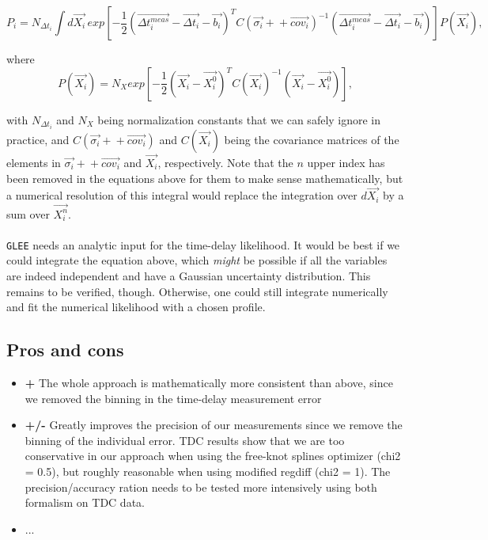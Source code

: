 \documentclass[11pt]{scrartcl}
\renewcommand{\vec}{\overrightarrow}  %
\begin{document}
\begin{equation*}
 P_i = N_{\Delta 
t_{i}}\int d\vec{X_i}\,exp\left[-\frac{1}{2}(\vec{\Delta 
t_i^{meas}}-\vec{\Delta t_i}-\vec{b_i})^T C(\vec{\sigma_i}+\!\!+ 
\vec{cov_i})^{-1}(\vec{\Delta 
t_i^{meas}}-\vec{\Delta t_i}-\vec{b_i})  \right]P(\vec{X_i}),
\end{equation*}

where
\begin{equation*}
 P(\vec{X_i}) = N_Xexp\left[-\frac{1}{2} (\vec{X_i}-\vec{X_i^0})^T 
C(\vec{X_i})^{-1} (\vec{X_i}-\vec{X_i^0})\right],
\end{equation*}

with $N_{\Delta 
t_{i}}$ and $N_X$ being normalization constants that we can safely 
ignore in practice, and $C(\vec{\sigma_i}+\!\!+ 
\vec{cov_i})$ and $C(\vec{X_i})$ being the covariance matrices of 
the elements in $\vec{\sigma_i}+\!\!+ 
\vec{cov_i}$ and $\vec{X_i}$, respectively. Note that the $n$ upper 
index has been removed in the equations above for them to make sense 
mathematically, but a numerical resolution of this integral would 
replace the integration over $d\vec{X_i}$ by a sum over $\vec{X_i^n}$.\\
\\
\texttt{GLEE} needs an analytic input for the time-delay likelihood. It 
would be best if we could integrate the equation above, which 
\emph{might} be possible if all the variables are indeed independent 
and have a Gaussian uncertainty distribution. This remains to be 
verified, though. Otherwise, one could still integrate numerically and 
fit the numerical likelihood with a chosen profile.

\subsection{Pros and cons}

\begin{itemize}
 \item \textbf{+} The whole approach is mathematically more consistent 
than above, since we removed the binning in the time-delay measurement 
error
 \item \textbf{+/-} Greatly improves the precision of our measurements 
since we remove the binning of the individual error. TDC results show 
that we are too conservative in our approach when using the free-knot 
splines optimizer (chi2 = 0.5), but roughly reasonable when using 
modified regdiff (chi2 = 1). The precision/accuracy ration needs to be 
tested more intensively using both formalism on TDC data.
 \item ...
\end{itemize}
\end{document}
